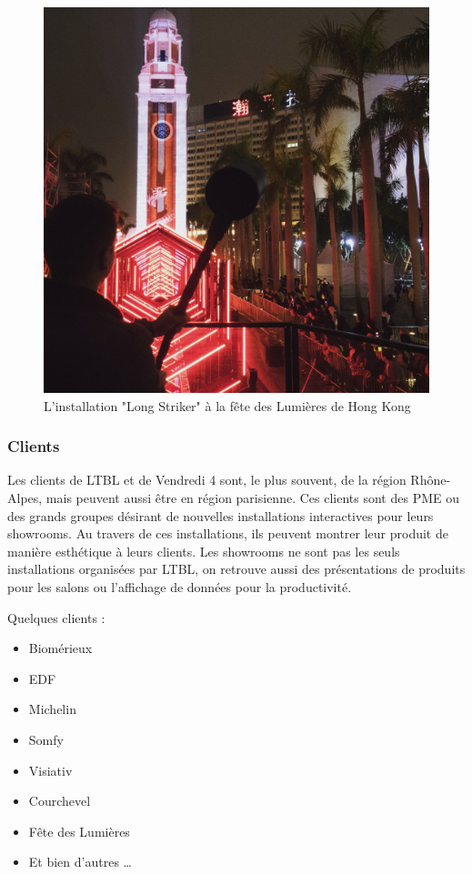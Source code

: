 \begin{figure}[h]
    \centering
    \includegraphics[scale=0.15]{img/long-striker.jpg}
    \caption{L'installation "Long Striker" à la fête des Lumières de Hong Kong}
\end{figure}

\clearpage

\subsubsection{Clients}

Les clients de LTBL et de Vendredi 4 sont, le plus souvent, de la région Rhône-Alpes, mais peuvent aussi être en région parisienne.
Ces clients sont des PME ou des grands groupes désirant de nouvelles installations interactives pour leurs showrooms.
Au travers de ces installations, ils peuvent montrer leur produit de manière esthétique à leurs clients.
Les showrooms ne sont pas les seuls installations organisées par LTBL, on retrouve aussi des présentations de produits pour les salons ou l'affichage de données pour la productivité.

\bigskip

Quelques clients :

\begin{multicols}{2}
    \begin{itemize}
        \item Biomérieux
        \item EDF
        \item Michelin
        \item Somfy
        \item Visiativ
        \item Courchevel
        \item Fête des Lumières
        \item Et bien d'autres \ldots
    \end{itemize}
\end{multicols}